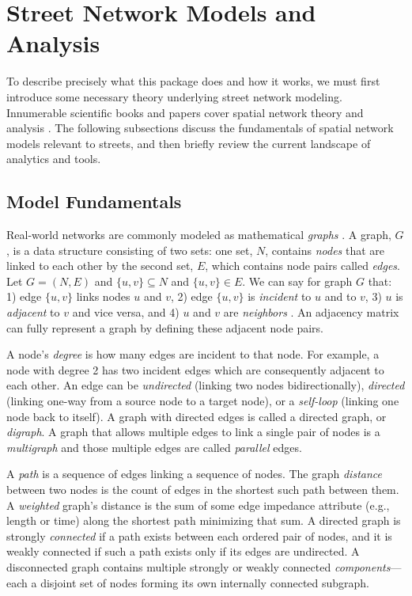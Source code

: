 \documentclass[12pt,letterpaper]{article} %
\begin{document}
\section{Street Network Models and Analysis}

To describe precisely what this package does and how it works, we must first introduce some necessary theory underlying street network modeling. Innumerable scientific books and papers cover spatial network theory and analysis \citep[e.g.,][]{tinkler_graph_1979,barnes_graph_1983,gastner_spatial_2006,barthelemy_spatial_2011,ducruet_spatial_2014,fischer_spatial_2014,marshall_street_2018}. The following subsections discuss the fundamentals of spatial network models relevant to streets, and then briefly review the current landscape of analytics and tools.

\subsection{Model Fundamentals}

Real-world networks are commonly modeled as mathematical \textit{graphs} \citep{trudeau_introduction_1994, barthelemy_spatial_2022}. A graph, $G$, is a data structure consisting of two sets: one set, $N$, contains \textit{nodes} that are linked to each other by the second set, $E$, which contains node pairs called \textit{edges}. Let $G = (N, E)$ and $\{u, v\} \subseteq N$ and $\{u, v\} \in E$. We can say for graph $G$ that: 1) edge $\{u, v\}$ links nodes $u$ and $v$, 2) edge $\{u, v\}$ is \textit{incident} to $u$ and to $v$, 3) $u$ is \textit{adjacent} to $v$ and vice versa, and 4) $u$ and $v$ are \textit{neighbors} \citep{newman_networks:_2010}. An adjacency matrix can fully represent a graph by defining these adjacent node pairs.

A node's \textit{degree} is how many edges are incident to that node. For example, a node with degree 2 has two incident edges which are consequently adjacent to each other. An edge can be \textit{undirected} (linking two nodes bidirectionally), \textit{directed} (linking one-way from a source node to a target node), or a \textit{self-loop} (linking one node back to itself). A graph with directed edges is called a directed graph, or \textit{digraph}. A graph that allows multiple edges to link a single pair of nodes is a \textit{multigraph} and those multiple edges are called \textit{parallel} edges.

A \textit{path} is a sequence of edges linking a sequence of nodes. The graph \textit{distance} between two nodes is the count of edges in the shortest such path between them. A \textit{weighted} graph's distance is the sum of some edge impedance attribute (e.g., length or time) along the shortest path minimizing that sum. A directed graph is strongly \textit{connected} if a path exists between each ordered pair of nodes, and it is weakly connected if such a path exists only if its edges are undirected. A disconnected graph contains multiple strongly or weakly connected \textit{components}---each a disjoint set of nodes forming its own internally connected subgraph.
\end{document}
